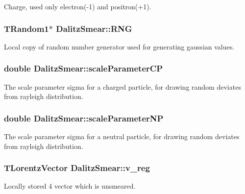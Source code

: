 Charge, used only electron(-1) and positron(+1). 

\subsubsection{\setlength{\rightskip}{0pt plus 5cm}TRandom1$\ast$ \bf{Dalitz\-Smear::RNG}}\label{classDalitzSmear_bfb2d568818dbaa7db9936a52bd9c079}


Local copy of random number generator used for generating gaussian values. 

\subsubsection{\setlength{\rightskip}{0pt plus 5cm}double \bf{Dalitz\-Smear::scale\-Parameter\-CP}\hspace{0.3cm}{\tt  [private]}}\label{classDalitzSmear_1ddd88ddea64ea384154ddf4a60d5574}


The scale parameter sigma for a charged particle, for drawing random deviates from rayleigh distribution. 

\subsubsection{\setlength{\rightskip}{0pt plus 5cm}double \bf{Dalitz\-Smear::scale\-Parameter\-NP}\hspace{0.3cm}{\tt  [private]}}\label{classDalitzSmear_7449e92c38450dc5d233046e9866100c}


The scale parameter sigma for a neutral particle, for drawing random deviates from rayleigh distribution. 

\subsubsection{\setlength{\rightskip}{0pt plus 5cm}TLorentz\-Vector \bf{Dalitz\-Smear::v\_\-reg}}\label{classDalitzSmear_9340d830c97814a02c2b2749e924abc8}


Locally stored 4 vector which is unsmeared. 

